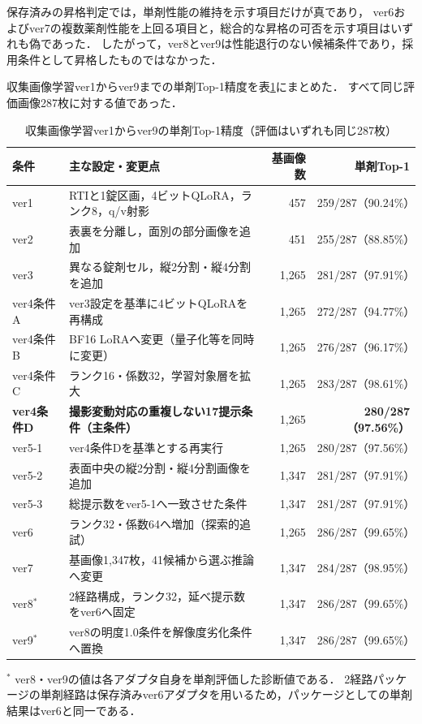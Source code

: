 \documentclass[uplatex,dvipdfmx]{jsarticle}
\begin{document}
保存済みの昇格判定では，単剤性能の維持を示す項目だけが真であり，
ver6およびver7の複数薬剤性能を上回る項目と，総合的な昇格の可否を示す項目はいずれも偽であった．
したがって，ver8とver9は性能退行のない候補条件であり，採用条件として昇格したものではなかった．

収集画像学習ver1からver9までの単剤Top-1精度を表\ref{tab:ver1_ver9_single}にまとめた．
すべて同じ評価画像287枚に対する値であった．

\begin{table}[htbp]
  \centering
  \caption{収集画像学習ver1からver9の単剤Top-1精度（評価はいずれも同じ287枚）}
  \label{tab:ver1_ver9_single}
  \small
  \setlength{\tabcolsep}{4pt}
  \begin{tabular}{|l|p{6.0cm}|r|r|}
    \hline
    条件 & 主な設定・変更点 & 基画像数 & 単剤Top-1 \\ \hline
    ver1 & RTIと1錠区画，4ビットQLoRA，ランク8，q/v射影 & 457 & 259/287（90.24\%） \\ \hline
    ver2 & 表裏を分離し，面別の部分画像を追加 & 451 & 255/287（88.85\%） \\ \hline
    ver3 & 異なる錠剤セル，縦2分割・縦4分割を追加 & 1,265 & 281/287（97.91\%） \\ \hline
    ver4条件A & ver3設定を基準に4ビットQLoRAを再構成 & 1,265 & 272/287（94.77\%） \\ \hline
    ver4条件B & BF16 LoRAへ変更（量子化等を同時に変更） & 1,265 & 276/287（96.17\%） \\ \hline
    ver4条件C & ランク16・係数32，学習対象層を拡大 & 1,265 & 283/287（98.61\%） \\ \hline
    \textbf{ver4条件D} & \textbf{撮影変動対応の重複しない17提示条件（主条件）} & 1,265 & \textbf{280/287（97.56\%）} \\ \hline
    ver5-1 & ver4条件Dを基準とする再実行 & 1,265 & 280/287（97.56\%） \\ \hline
    ver5-2 & 表面中央の縦2分割・縦4分割画像を追加 & 1,347 & 281/287（97.91\%） \\ \hline
    ver5-3 & 総提示数をver5-1へ一致させた条件 & 1,347 & 281/287（97.91\%） \\ \hline
    ver6 & ランク32・係数64へ増加（探索的追試） & 1,265 & 286/287（99.65\%） \\ \hline
    ver7 & 基画像1,347枚，41候補から選ぶ推論へ変更 & 1,347 & 284/287（98.95\%） \\ \hline
    ver8$^{\ast}$ & 2経路構成，ランク32，延べ提示数をver6へ固定 & 1,347 & 286/287（99.65\%） \\ \hline
    ver9$^{\ast}$ & ver8の明度1.0条件を解像度劣化条件へ置換 & 1,347 & 286/287（99.65\%） \\ \hline
  \end{tabular}

  \vspace{1mm}
  {\scriptsize $^{\ast}$ ver8・ver9の値は各アダプタ自身を単剤評価した診断値である．
  2経路パッケージの単剤経路は保存済みver6アダプタを用いるため，パッケージとしての単剤結果はver6と同一である．}
\end{table}
\end{document}
